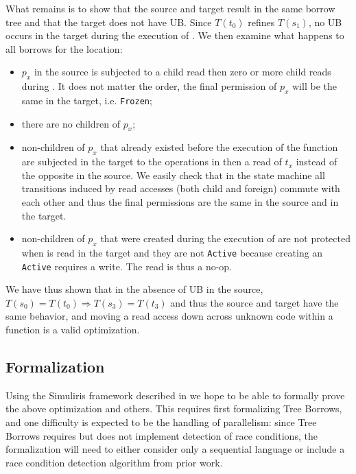 \documentclass[a4paper,11pt]{article}
\theoremstyle{plain}
\theoremstyle{definition}
\theoremstyle{remark}
\newcommand{\tcode}[1]{\rstinline{#1}}
\newcommand{\tperm}[1]{\texttt{#1}}
\begin{document}
What remains is to show that the source and target result in the same
borrow tree and that the target does not have UB. Since \(T(t_0)\) refines
\(T(s_1)\), no UB occurs in the target during the execution of \tcode{g}.
We then examine what happens to all borrows for the location:
\begin{itemize}
    \item \(p_x\) in the source is subjected to a child read then zero or more
        child reads during \tcode{g}. It does not matter the order, the final
        permission of \(p_x\) will be the same in the target, i.e. \tperm{Frozen};
    \item there are no children of \(p_x\);
    \item non-children of \(p_x\) that already existed before the execution
        of the function are subjected in the target to the operations in \tcode{g}
        then a read of \(t_x\) instead of the opposite in the source. We easily
        check that in the state machine all transitions induced by read accesses
        (both child and foreign) commute with each other and thus the final
        permissions are the same in the source and in the target.
    \item non-children of \(p_x\) that were created during the execution of \tcode{g}
        are not protected when \tcode{*x} is read in the target and they are not
        \tperm{Active} because creating an \tperm{Active} requires a write.
        The read is thus a no-op.
\end{itemize}

We have thus shown that in the absence of UB in the source,
\(T(s_0) = T(t_0) \Longrightarrow T(s_3) = T(t_3)\) and
thus the source and target have the same behavior, and moving a read access
down across unknown code within a function is a valid optimization.

\subsection{Formalization}

Using the Simuliris framework described in \cite{simuliris} we hope to be able to formally prove the
above optimization and others. This requires first formalizing Tree Borrows,
and one difficulty is expected to be the handling of parallelism: since Tree
Borrows requires but does not implement detection of race conditions, the formalization
will need to either consider only a sequential language or include a race condition
detection algorithm from prior work.
\end{document}

